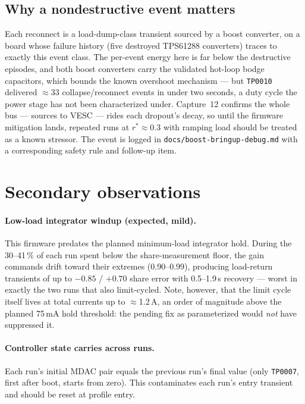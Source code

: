 \documentclass[11pt]{article}
\newcommand{\code}[1]{\texttt{#1}}
\begin{document}
\subsection{Why a nondestructive event matters}

Each reconnect is a load-dump-class transient sourced by a boost converter, on a
board whose failure history (five destroyed TPS61288 converters) traces to exactly
this event class. The per-event energy here is far below the destructive episodes,
and both boost converters carry the validated hot-loop bodge capacitors, which
bounds the known overshoot mechanism --- but \code{TP0010} delivered $\approx$33
collapse/reconnect events in under two seconds, a duty cycle the power stage has
not been characterized under. Capture~12 confirms the whole bus --- sources to VESC
--- rides each dropout's decay, so until the firmware mitigation lands, repeated
runs at $r^\ast\approx0.3$ with ramping load should be treated as a known stressor. The
event is logged in \code{docs/boost-bringup-debug.md} with a corresponding safety
rule and follow-up item.

\section{Secondary observations}

\paragraph{Low-load integrator windup (expected, mild).} This firmware predates the
planned minimum-load integrator hold. During the 30--41\,\% of each run spent below
the share-measurement floor, the gain commands drift toward their extremes
(0.90--0.99), producing load-return transients of up to $-0.85$ / $+0.70$ share
error with 0.5--1.9\,s recovery --- worst in exactly the two runs that also limit-cycled.
Note, however, that the limit cycle itself lives at total currents up to
$\approx$1.2\,A, an order of magnitude above the planned 75\,mA hold threshold: the
pending fix as parameterized would \emph{not} have suppressed it.

\paragraph{Controller state carries across runs.} Each run's initial MDAC pair
equals the previous run's final value (only \code{TP0007}, first after boot, starts
from zero). This contaminates each run's entry transient and should be reset at
profile entry.
\end{document}
